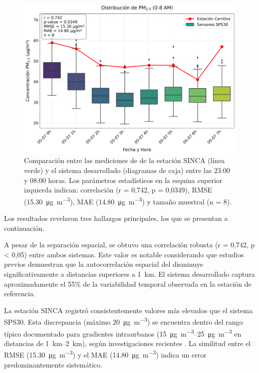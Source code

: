 \begin{figure}[!hbp]
	\centering
	\includegraphics[width=1\linewidth]{Figures/serie_comparativa_con_cerrillos}
	\caption{Comparación entre las mediciones de \MPF de la estación SINCA (línea verde) y el sistema desarrollado (diagramas de caja) entre las 23:00 y 08:00 horas. Los parámetros estadísticos en la esquina superior izquierda indican: correlación (r = 0,742, p = 0,0349), RMSE (\SI{15.30}{\micro\gram\per\cubic\meter}), MAE (\SI{14.80}{\micro\gram\per\cubic\meter}) y tamaño muestral (n = 8).}
	\label{fig:seriecomparativaconcerrillos}
	
\end{figure}

Los resultados revelaron tres hallazgos principales, los que se presentan a continuación.


A pesar de la separación espacial, se obtuvo una correlación robusta (r = 0,742, p < 0,05) entre ambos sistemas. Este valor es notable considerando que estudios previos \citep{Nasar2024} demuestran que la autocorrelación espacial del \MPF disminuye significativamente a distancias superiores a \SI{1}{\kilo\meter}. El sistema desarrollado captura aproximadamente el 55\% de la variabilidad temporal observada en la estación de referencia.

La estación SINCA registró consistentemente valores más elevados que el sistema SPS30. Esta discrepancia (máximo \SI{20}{\micro\gram\per\cubic\meter}) se encuentra dentro del rango típico documentado para gradientes intraurbanos (\SIrange{15}{25}{\micro\gram\per\cubic\meter} en distancias de \SIrange{1}{2}{\kilo\meter}), según investigaciones recientes \citep{Martin2019}. La similitud entre el RMSE (\SI{15.30}{\micro\gram\per\cubic\meter}) y el MAE (\SI{14.80}{\micro\gram\per\cubic\meter}) indica un error predominantemente sistemático.



